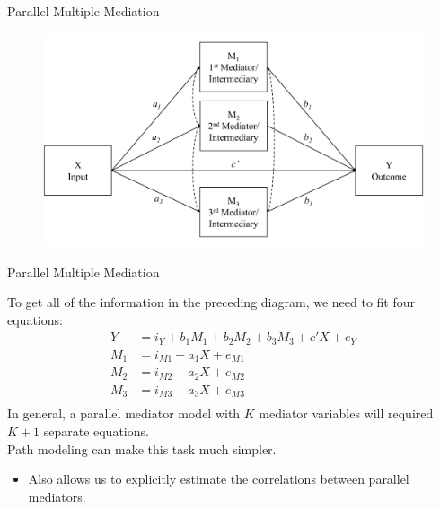 \documentclass{beamer}
\newcommand{\va}[0]{\vspace{12pt}}
\newcommand{\vb}[0]{\vspace{6pt}}
\begin{document}
\begin{frame}{Parallel Multiple Mediation}

  \begin{figure}
    \includegraphics[width=\textwidth]{figures/parallelDiagram.pdf}
  \end{figure}

\end{frame}


\begin{frame}{Parallel Multiple Mediation}
  
  To get all of the information in the preceding diagram, we need to
  fit four equations:
  \begin{align*}
    Y &= i_Y + b_1 M_1 + b_2 M_2 + b_3 M_3 + c' X + e_Y\\
    M_1 &= i_{M1} + a_1 X + e_{M1}\\
    M_2 &= i_{M2} + a_2 X + e_{M2}\\
    M_3 &= i_{M3} + a_3 X + e_{M3}\\
  \end{align*}
  In general, a parallel mediator model with $K$ mediator
  variables will required $K + 1$ separate equations.
  \\ 
  \va 
  Path modeling can make this task much simpler.
  \vb
  \begin{itemize}
  \item Also allows us to explicitly estimate the correlations
    between parallel mediators.
  \end{itemize}
  
\end{frame}
\end{document}
